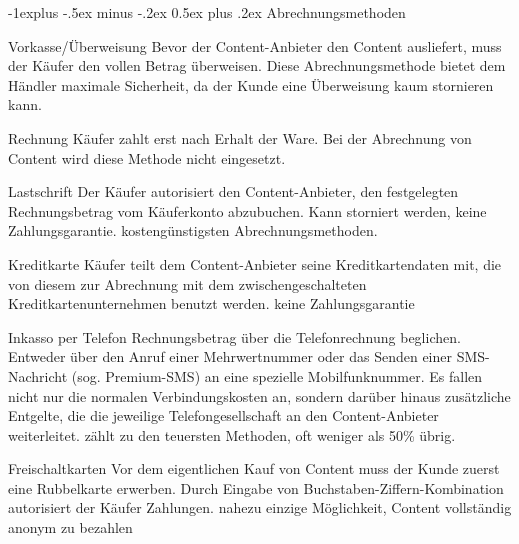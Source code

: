 \documentclass[a4paper]{article}
\makeatletter
\renewcommand{\subsection}{\@startsection{subsection}{2}{0mm}%
                                {-1explus -.5ex minus -.2ex}%
                                {0.5ex plus .2ex}%
                                {\normalfont\normalsize\bfseries}}
\makeatother
\begin{document}
\begin{multicols*}{3}
  \subsection{Abrechnungsmethoden}
  \begin{description*}
    \item[Vorkasse/Überweisung] Bevor der Content-Anbieter den Content ausliefert, muss der Käufer den vollen Betrag überweisen. Diese Abrechnungsmethode bietet dem Händler maximale Sicherheit, da der Kunde eine Überweisung kaum stornieren kann.
    \item[Rechnung] Käufer zahlt erst nach Erhalt der Ware. Bei der Abrechnung von Content wird diese Methode nicht eingesetzt.
    \item[Lastschrift] Der Käufer autorisiert den Content-Anbieter, den festgelegten Rechnungsbetrag vom Käuferkonto abzubuchen. Kann storniert werden, keine Zahlungsgarantie. kostengünstigsten Abrechnungsmethoden.
    \item[Kreditkarte] Käufer teilt dem Content-Anbieter seine Kreditkartendaten mit, die von diesem zur Abrechnung mit dem zwischengeschalteten Kreditkartenunternehmen benutzt werden. keine Zahlungsgarantie
    \item[Inkasso per Telefon] Rechnungsbetrag über die Telefonrechnung beglichen. Entweder über den Anruf einer Mehrwertnummer oder das Senden einer SMS-Nachricht (sog. Premium-SMS) an eine spezielle Mobilfunknummer. Es fallen nicht nur die normalen Verbindungskosten an, sondern darüber hinaus zusätzliche Entgelte, die die jeweilige Telefongesellschaft an den Content-Anbieter weiterleitet. zählt zu den teuersten Methoden, oft weniger als 50\% übrig.
    \item[Freischaltkarten] Vor dem eigentlichen Kauf von Content muss der Kunde zuerst eine Rubbelkarte erwerben. Durch Eingabe von Buchstaben-Ziffern-Kombination autorisiert der Käufer Zahlungen. nahezu einzige Möglichkeit, Content vollständig anonym zu bezahlen
  \end{description*}


\end{multicols*}
\end{document}
